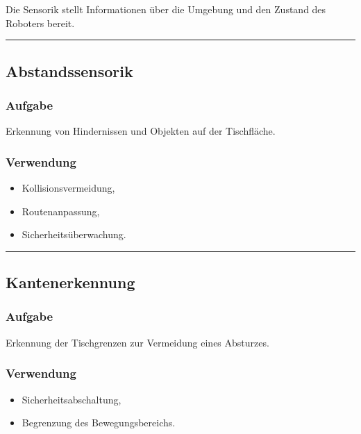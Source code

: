 \documentclass[
]{article}
\providecommand{\tightlist}{%
  \setlength{\itemsep}{0pt}\setlength{\parskip}{0pt}}
\begin{document}
Die Sensorik stellt Informationen über die Umgebung und den Zustand des
Roboters bereit.

\begin{center}\rule{0.5\linewidth}{0.5pt}\end{center}

\subsection{Abstandssensorik}\label{abstandssensorik}

\subsubsection{Aufgabe}\label{aufgabe-3}

Erkennung von Hindernissen und Objekten auf der Tischfläche.

\subsubsection{Verwendung}\label{verwendung}

\begin{itemize}
\tightlist
\item
  Kollisionsvermeidung,
\item
  Routenanpassung,
\item
  Sicherheitsüberwachung.
\end{itemize}

\begin{center}\rule{0.5\linewidth}{0.5pt}\end{center}

\subsection{Kantenerkennung}\label{kantenerkennung}

\subsubsection{Aufgabe}\label{aufgabe-4}

Erkennung der Tischgrenzen zur Vermeidung eines Absturzes.

\subsubsection{Verwendung}\label{verwendung-1}

\begin{itemize}
\tightlist
\item
  Sicherheitsabschaltung,
\item
  Begrenzung des Bewegungsbereichs.
\end{itemize}
\end{document}
